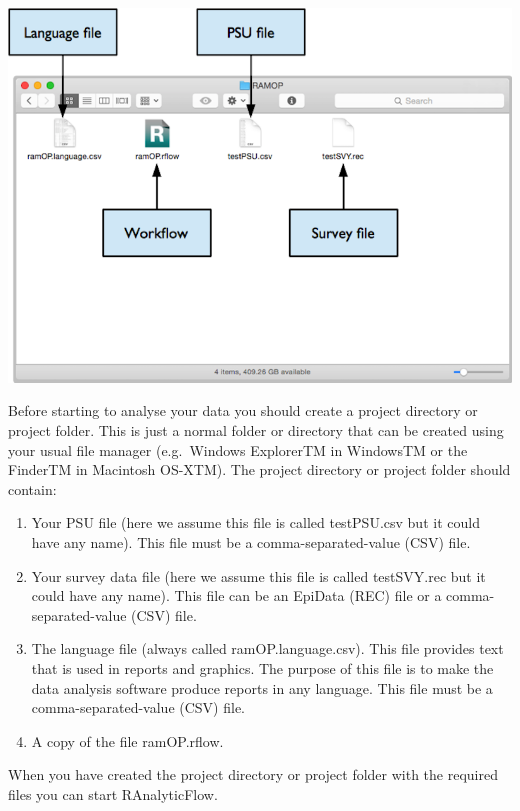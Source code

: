 \documentclass[12pt,a4paper]{book}
\theoremstyle{definition}
\theoremstyle{definition}
\theoremstyle{definition}
\theoremstyle{remark}
\begin{document}
\begin{center}\includegraphics{figures/dirStructureRAF} \end{center}

Before starting to analyse your data you should create a project
directory or project folder. This is just a normal folder or directory
that can be created using your usual file manager (e.g.~Windows
ExplorerTM in WindowsTM or the FinderTM in Macintosh OS-XTM). The
project directory or project folder should contain:

\begin{enumerate}
\def\labelenumi{\arabic{enumi}.}
\item
  Your PSU file (here we assume this file is called testPSU.csv but it
  could have any name). This file must be a comma-separated-value (CSV)
  file.
\item
  Your survey data file (here we assume this file is called testSVY.rec
  but it could have any name). This file can be an EpiData (REC) file or
  a comma-separated-value (CSV) file.
\item
  The language file (always called ramOP.language.csv). This file
  provides text that is used in reports and graphics. The purpose of
  this file is to make the data analysis software produce reports in any
  language. This file must be a comma-separated-value (CSV) file.
\item
  A copy of the file ramOP.rflow.
\end{enumerate}

When you have created the project directory or project folder with the
required files you can start RAnalyticFlow.
\end{document}
